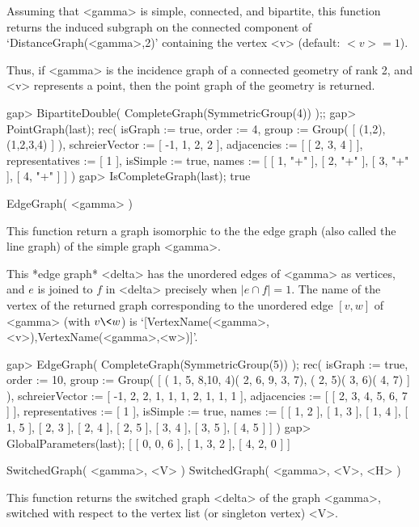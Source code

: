 Assuming that <gamma>  is simple, connected, and bipartite, this function
returns   the  induced   subgraph   on   the   connected   component   of
`DistanceGraph(<gamma>,2)'   containing  the   vertex   <v>  (default:
$<v>=1$).

Thus, if <gamma> is the incidence graph of a connected geometry of rank
2, and <v> represents a point, then the point graph of the geometry is
returned.

\beginexample
gap> BipartiteDouble( CompleteGraph(SymmetricGroup(4)) );;
gap> PointGraph(last);
rec(
  isGraph := true,
  order := 4,
  group := Group( [ (1,2), (1,2,3,4) ] ),
  schreierVector := [ -1, 1, 2, 2 ],
  adjacencies := [ [ 2, 3, 4 ] ],
  representatives := [ 1 ],
  isSimple := true,
  names := [ [ 1, "+" ], [ 2, "+" ], [ 3, "+" ], [ 4, "+" ] ] )
gap> IsCompleteGraph(last);
true
\endexample


\>EdgeGraph( <gamma> )

This function return a graph isomorphic to the the edge graph (also
called the line graph) of the simple graph <gamma>.

This *edge graph* <delta> has the unordered edges of <gamma>
as vertices, and $e$ is joined to $f$ in <delta> precisely when
$|e\cap f|=1$.  The name of the vertex of the returned graph
corresponding to the unordered edge $[v,w]$ of <gamma> (with $v\< w$)
is `[VertexName(<gamma>,<v>),VertexName(<gamma>,<w>)]'.

\beginexample
gap> EdgeGraph( CompleteGraph(SymmetricGroup(5)) );
rec(
  isGraph := true,
  order := 10,
  group := Group( [ ( 1, 5, 8,10, 4)( 2, 6, 9, 3, 7), ( 2, 5)( 3, 6)( 4, 7)
     ] ),
  schreierVector := [ -1, 2, 2, 1, 1, 1, 2, 1, 1, 1 ],
  adjacencies := [ [ 2, 3, 4, 5, 6, 7 ] ],
  representatives := [ 1 ],
  isSimple := true,
  names := [ [ 1, 2 ], [ 1, 3 ], [ 1, 4 ], [ 1, 5 ], [ 2, 3 ], [ 2, 4 ],
      [ 2, 5 ], [ 3, 4 ], [ 3, 5 ], [ 4, 5 ] ] )
gap> GlobalParameters(last);
[ [ 0, 0, 6 ], [ 1, 3, 2 ], [ 4, 2, 0 ] ]
\endexample



\>SwitchedGraph( <gamma>, <V> ) 
\>SwitchedGraph( <gamma>, <V>, <H> ) 

This function returns the switched graph <delta> of the graph <gamma>,
switched with respect to the vertex list (or singleton vertex) <V>.

